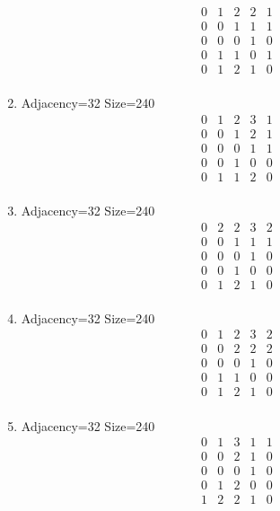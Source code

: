 \documentclass[12pt]{article}
\begin{document}
\begin{multicols}{3}
\begin{enumerate}
\begin{equation*}
\begin{array}{ccccc}
0&1&2&2&1\\
0&0&1&1&1\\
0&0&0&1&0\\
0&1&1&0&1\\
0&1&2&1&0\\
\end{array}
\end{equation*}
\item Adjacency=32 Size=240
\begin{equation*}
\begin{array}{ccccc}
0&1&2&3&1\\
0&0&1&2&1\\
0&0&0&1&1\\
0&0&1&0&0\\
0&1&1&2&0\\
\end{array}
\end{equation*}
\item Adjacency=32 Size=240
\begin{equation*}
\begin{array}{ccccc}
0&2&2&3&2\\
0&0&1&1&1\\
0&0&0&1&0\\
0&0&1&0&0\\
0&1&2&1&0\\
\end{array}
\end{equation*}
\item Adjacency=32 Size=240
\begin{equation*}
\begin{array}{ccccc}
0&1&2&3&2\\
0&0&2&2&2\\
0&0&0&1&0\\
0&1&1&0&0\\
0&1&2&1&0\\
\end{array}
\end{equation*}
\item Adjacency=32 Size=240
\begin{equation*}
\begin{array}{ccccc}
0&1&3&1&1\\
0&0&2&1&0\\
0&0&0&1&0\\
0&1&2&0&0\\
1&2&2&1&0\\
\end{array}

\end{equation*}
\end{enumerate}
\end{multicols}
\end{document}
